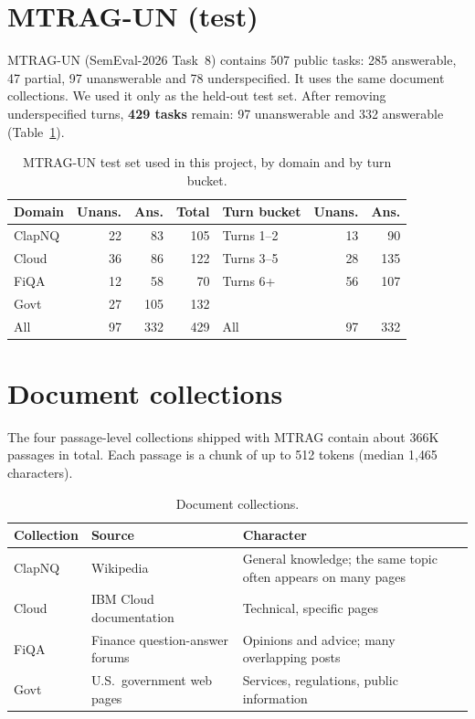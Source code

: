 \documentclass[11pt,a4paper]{report}
\begin{document}
\section{MTRAG-UN (test)}
MTRAG-UN \cite{mtragun} (SemEval-2026 Task~8) contains 507 public tasks: 285 answerable, 47 partial, 97 unanswerable and 78 underspecified. It uses the same document collections. We used it only as the held-out test set. After removing underspecified turns, \textbf{429 tasks} remain: 97 unanswerable and 332 answerable (Table~\ref{tab:test}).

\begin{table}[H]
\centering\small
\begin{tabular}{@{}lrrr@{\hspace{2em}}lrr@{}}
\toprule
Domain & Unans. & Ans. & Total & Turn bucket & Unans. & Ans. \\
\midrule
ClapNQ & 22 & 83 & 105 & Turns 1--2 & 13 & 90 \\
Cloud & 36 & 86 & 122 & Turns 3--5 & 28 & 135 \\
FiQA & 12 & 58 & 70 & Turns 6+ & 56 & 107 \\
Govt & 27 & 105 & 132 & & & \\
\midrule
All & 97 & 332 & 429 & All & 97 & 332 \\
\bottomrule
\end{tabular}
\caption{MTRAG-UN test set used in this project, by domain and by turn bucket.}
\label{tab:test}
\end{table}

\section{Document collections}
The four passage-level collections shipped with MTRAG contain about 366K passages in total. Each passage is a chunk of up to 512 tokens (median 1{,}465 characters).
\begin{table}[H]
\centering\small
\begin{tabularx}{\textwidth}{@{}llY@{}}
\toprule
Collection & Source & Character \\
\midrule
ClapNQ & Wikipedia & General knowledge; the same topic often appears on many pages \\
Cloud & IBM Cloud documentation & Technical, specific pages \\
FiQA & Finance question-answer forums & Opinions and advice; many overlapping posts \\
Govt & U.S.\ government web pages & Services, regulations, public information \\
\bottomrule
\end{tabularx}
\caption{Document collections.}
\end{table}
\end{document}
